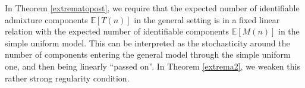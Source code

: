 \documentclass[12pt, reqno]{amsart}
\theoremstyle{definition}
\begin{document}




\iffalse
In Theorem \ref{extrematopost}, we require that the expected number of identifiable admixture components $\mathbb{E}[T(n)]$ in the general setting is in a fixed linear relation with the expected number of identifiable components $\mathbb{E}[M(n)]$ in the simple uniform model. This can be interpreted as the stochasticity around the number of components entering the  general model through the simple uniform one, and then being linearly ``passed on''. 
In Theorem \ref{extrema2}, we weaken this rather strong regularity condition. 

\end{document}
